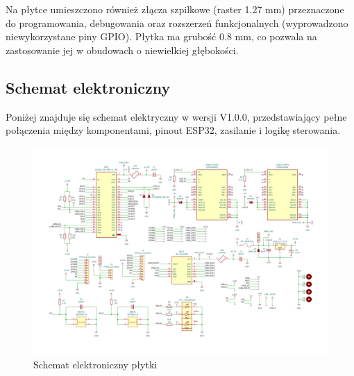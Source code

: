 Na płytce umieszczono również złącza szpilkowe (raster 1.27 mm) przeznaczone do programowania, debugowania oraz rozszerzeń funkcjonalnych (wyprowadzono niewykorzystane piny GPIO). Płytka ma grubość 0.8 mm, co pozwala na zastosowanie jej w obudowach o niewielkiej głębokości.

\clearpage
\subsection{Schemat elektroniczny}

Poniżej znajduje się schemat elektryczny w wersji V1.0.0, przedstawiający pełne połączenia między komponentami, pinout ESP32, zasilanie i logikę sterowania.

\begin{figure}[htbp]
\centering
	\includegraphics[width=\textwidth]{root/pcb_schematic.png}
	\caption{Schemat elektroniczny płytki}
\end{figure}

